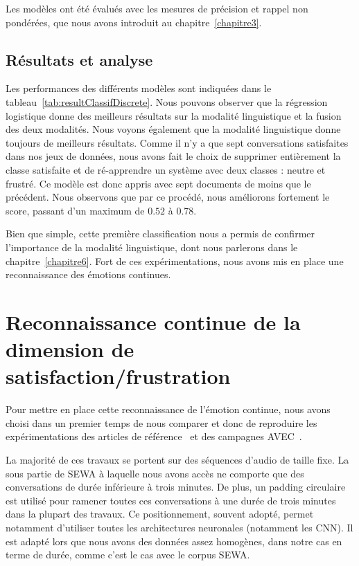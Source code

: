 Les modèles ont été évalués avec les mesures de précision et rappel non pondérées, que nous avons introduit au chapitre~\ref{chapitre3}.

\subsection{Résultats et analyse}



Les  performances des différents modèles sont indiquées dans le tableau~\ref{tab:resultClassifDiscrete}. Nous pouvons observer que la régression logistique donne des meilleurs résultats sur la modalité linguistique et la fusion des deux modalités. Nous voyons également que la modalité linguistique donne toujours de meilleurs résultats. Comme il n'y a que sept conversations satisfaites dans nos jeux de données, nous avons fait le choix de supprimer entièrement la classe satisfaite et de ré-apprendre un système avec deux classes : neutre et frustré. Ce modèle est donc appris avec sept documents de moins que le précédent. Nous observons que par ce procédé, nous améliorons fortement le score, passant d'un maximum de $0.52$ à $0.78$.

Bien que simple, cette première classification nous a permis de confirmer l'importance de la modalité linguistique, dont nous parlerons dans le chapitre~\ref{chapitre6}. Fort de ces expérimentations, nous avons mis en place une reconnaissance des émotions continues.

\section{Reconnaissance continue de la dimension de satisfaction/frustration}
\label{sec:5.3}
Pour mettre en place cette reconnaissance de l'émotion continue, nous avons choisi dans un premier temps de nous comparer et donc de reproduire les expérimentations des articles de référence~\cite{Schmitt2019,SEWA} et des campagnes AVEC~\cite{AVEC2017,AVEC2018,AVEC2019}.

La majorité de ces travaux se portent sur des séquences d'audio de taille fixe. La sous partie de SEWA à laquelle nous avons accès ne comporte que des conversations de durée inférieure à trois minutes. De plus, un padding circulaire est utilisé pour ramener toutes ces conversations à une durée de trois minutes dans la plupart des travaux. Ce positionnement, souvent adopté, permet notamment d'utiliser toutes les architectures neuronales (notamment les CNN). Il est adapté lors que nous avons des données assez homogènes, dans notre cas en terme de durée, comme c'est le cas avec le corpus SEWA.

